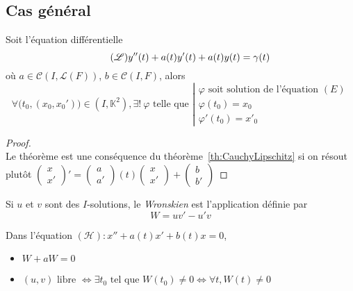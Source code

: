 \documentclass[11pt,a4paper,fleqn,pdftex]{report}
\begin{document}
\subsection{Cas général}
\begin{itheorem}
Soit l'équation différentielle 
\begin{equation}\tag{$\mathscr{L}$}
    y''(t) + a(t) y'(t) + a(t)y(t)= \gamma (t)
\end{equation}
où $a \in \mathcal{C}\left( I,\mathscr{L}(F)\right)$, $b\in \mathcal{C}(I,F)$, alors
\[
    \forall \big( t_0,(x_0,x_0') \big) \in (I,\mathbb{K}^2), \exists ! \: \varphi \text{ telle que }
    \left|
    \begin{array}{l}
        \varphi \text{ soit solution de l'équation }(E)\\
        \varphi(t_0)=x_0 \\
        \varphi'(t_0) = x'_0
    \end{array}
    \right.
\]
\end{itheorem}
\begin{proof} \hfill \\
    Le théorème est une conséquence du théorème~\ref{th:CauchyLipschitz} si on résout plutôt $\begin{pmatrix} x \\ x' \end{pmatrix}' = \begin{pmatrix} a \\ a' \end{pmatrix}(t)\begin{pmatrix} x \\ x' \end{pmatrix} + \begin{pmatrix} b \\ b' \end{pmatrix}$ 
\end{proof}
\begin{dfn}[Wronskien]
    Si $u$ et $v$ sont des $I$-solutions, le \emph{Wronskien} est l'application définie par
    \begin{equation}
    W = uv' - u'v \tag{Wronskien}
    \end{equation}
\end{dfn}
\begin{prop}
Dans l'équation $(\mathcal{H}) : x'' + a(t)x' + b(t) x =0$,
\begin{itemize}
    \item $W + a W = 0$
    \item $(u,v)\text{ libre }\Leftrightarrow \exists t_0 \text{ tel que } W(t_0) \neq 0 \Leftrightarrow \forall t, W(t) \neq 0$
\end{itemize}
\end{prop}
\end{document}
